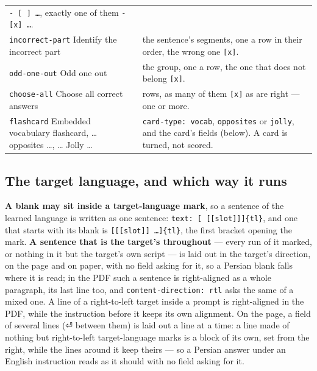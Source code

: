 \documentclass[11pt,oneside]{report}
\newcommand{\pw}[1]{\babelsublr{\mbox{\foreignlanguage{persian}{#1}}}}
\newcommand{\sym}[1]{{\symfont #1}}
\newcommand{\menu}[1]{\textsf{#1}}
\begin{document}
\begin{center}
\begin{longtable}{@{}>{\raggedright\arraybackslash}p{}>{\raggedright\arraybackslash}p{}@{}}
  \texttt{- [ ] \ldots}, exactly one of them \texttt{- [x] \ldots}. \\
\addlinespace
\texttt{incorrect-part} \newline \menu{Identify the incorrect part} & the
  sentence's segments, one a row in their order, the wrong one \texttt{[x]}. \\
\addlinespace
\texttt{odd-one-out} \newline \menu{Odd one out} & the group, one a row, the
  one that does not belong \texttt{[x]}. \\
\addlinespace
\texttt{choose-all} \newline \menu{Choose all correct answers} & rows, as
  many of them \texttt{[x]} as are right --- one or more. \\
\addlinespace
\texttt{flashcard} \newline \menu{Embedded vocabulary flashcard},
\menu{\ldots{} opposites \ldots}, \menu{\ldots{} Jolly \ldots} &
  \texttt{card-type: vocab}, \texttt{opposites} or \texttt{jolly}, and the
  card's fields (below). A card is turned, not scored. \\
\bottomrule
\end{longtable}
\end{center}

\subsection*{The target language, and which way it runs}

\textbf{A blank may sit inside a target-language mark}, so a sentence of the
learned language is written as one sentence:
\texttt{text: [}\pw{من بابک}\texttt{ [[slot]]]\{tl\}}, and one that starts
with its blank is \texttt{[[[slot]] \ldots]\{tl\}}, the first bracket
opening the mark. \textbf{A sentence that is the target's throughout} ---
every run of it marked, or nothing in it but the target's own script --- is
laid out in the target's direction, on the page and on paper, with no field
asking for it, so a Persian blank falls where it is read; in the PDF such a
sentence is right-aligned as a whole paragraph, its last line too, and
\texttt{content-direction: rtl} asks the same of a mixed one. A line of a
right-to-left target inside a prompt is right-aligned in the PDF, while the
instruction before it keeps its own alignment. On the page, a field of several
lines (\sym{⏎} between them) is laid out a line at a time: a line made of
nothing but right-to-left target-language marks is a block of its own, set
from the right, while the lines around it keep theirs --- so a Persian
answer under an English instruction reads as it should with no field asking
for it.
\end{document}

